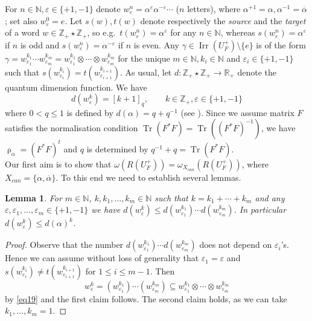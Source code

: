 \documentclass[11 pt, leqno]{amsart}
\newcommand{\eps}{\varepsilon}
\newcommand{\ov}{\overline}
\newcommand{\NN}{\mathbb{N}}
\newcommand{\RR}{\mathbb{R}}
\newcommand{\ZZ}{\mathbb{Z}}
\DeclareMathOperator{\Irr}{Irr}
\DeclareMathOperator{\Tr}{Tr}
\newtheorem{lemma}[theorem]{Lemma}
\theoremstyle{definition}
\numberwithin{equation}{section}
\begin{document}
For $n\in\NN,\eps\in\{+1,-1\}$ denote $w^n_\eps=\alpha^{\eps}\alpha^{-\eps}\cdots$ ($n$ letters), where $\alpha^{+1}=\alpha, \alpha^{-1}=\ov\alpha$; set also $w^0_\eps=e$. Let $s(w),t(w)$ denote respectively the \emph{source} and the \emph{target} of a word $w \in\ZZ_+\star\ZZ_+$, so e.g.~$t(w^n_\eps)=\alpha^\eps$ for any $n \in \NN$, whereas $s(w^n_\eps)=\alpha^\eps$ if $n$ is odd and $s(w^n_\eps)=\alpha^{-\eps}$ if $n$ is even. Any $\gamma\in \Irr(U_F^+)\setminus\{e\}$ is of the form $\gamma=w^{k_1}_{\eps_{1}}\cdots w^{k_m}_{\eps_m}=
w^{k_1}_{\eps_{1}}\otimes\cdots \otimes w^{k_m}_{\eps_m}$ for the unique $m\in\NN, k_i\in \NN$ and $\eps_i\in \{+1,-1\}$ such that $s(w^{k_i}_{\eps_i})=t(w^{k_{i+1}}_{\eps_{i+1}})$. As usual, let $d\colon\ZZ_+\star \ZZ_+ \to \RR_+$ denote the quantum dimension function. We have
\begin{equation}\label{eq20}
d(w^k_\eps)=[k+1]_q,\qquad k\in \ZZ_+,\eps\in\{+1,-1\}
\end{equation}
where $0<q\le 1$ is defined by $d(\alpha)=q+q^{-1}$ (see \cite[Lemma 4.12, Lemma 4.13]{KrajczokWasilewski}). Since we assume matrix $F$ satisfies the normalisation condition $\Tr(F^*F)=\Tr((F^*F)^{-1})$, we have $\uprho_\alpha=(F^*F)^{t}$ \cite[Example 1.4.2]{NeshveyevTuset} and $q$ is determined by $q^{-1}+q=\Tr(F^*F)$.\\

Our first aim is to show that $\omega(R(U_F^+))=\omega_{X_{can}}(R(U_F^+))$, where $X_{can}=\{\alpha,\ov\alpha\}$. To this end we need to establish several lemmas.

\begin{lemma}\label{lemma10}
For $m \in \NN$, $k,k_1,\dotsc,k_m\in \NN$ such that $k=k_1+\cdots +k_m$ and any $\eps,\eps_1,\dotsc,\eps_m\in\{+1,-1\}$ we have $d(w^k_\eps) \le d(w^{k_1}_{\eps_1})\cdots 
d(w^{k_m}_{\eps_m})$. In particular $d(w^k_\eps)\le d(\alpha)^k$.
\end{lemma}

\begin{proof}
Observe that the number $d(w^{k_1}_{\eps_1})\cdots 
d(w^{k_m}_{\eps_m})$ does not depend on $\eps_i$'s. Hence we can assume without loss of generality that $\eps_1=\eps$ and $s(w^{k_i}_{\eps_i})\neq  t(w^{k_{i+1}}_{\eps_{i+1}})$ for $1\le i\le m-1$. Then
\[
w^k_\eps=
(w^{k_1}_{\eps_1})\cdots(w^{k_m}_{\eps_m})\subseteq w^{k_1}_{\eps_1}\otimes\cdots
\otimes w^{k_m}_{\eps_m}
\]
by \eqref{eq19} and the first claim follows. The second claim holds, as we can take $k_1,\dotsc,k_m=1$.
\end{proof}
\end{document}
